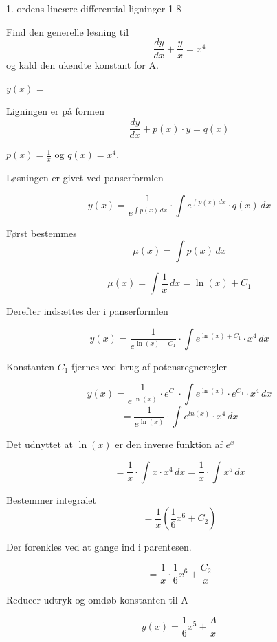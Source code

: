 \documentclass{article}
\begin{document}
\newpage

\begin{exercise}{1. ordens lineære differential ligninger 1-8}


Find den generelle løsning til
\[
\frac{dy}{dx} + \frac{y}{x} = x^4
\]
og kald den ukendte konstant for A.

$y(x)$ = 



\hint

Ligningen er på formen
\[
\frac{dy}{dx} + p(x) \cdot y = q(x)
\]

\hint

$p(x)=\frac{1}{x}$ og $q(x)=x^4$.

\hint

Løsningen er givet ved panserformlen


\hint

\[
y(x) = \frac{1}{e^{\int p(x) \, dx}} \cdot \int e^{\int p(x) \, dx} \cdot q(x) \, dx
\]

\hint

Først bestemmes
\[
\mu(x) = \int p(x) \, dx
\]

\hint
\[
\mu(x) = \int \frac{1}{x} \, dx = \ln(x)+ C_1
\]

\hint
Derefter indsættes der i panserformlen

\hint

\[
y(x) = \frac{1}{e^{\ln(x) + C_1}} \cdot \int e^{\ln(x) + C_1} \cdot x^4 \, dx
\]


\hint

Konstanten $C_1$ fjernes ved brug af potensregneregler

\hint
\[
y(x) = \frac{1}{e^{\ln(x)}} \cdot e^{C_1} \cdot \int e^{\ln(x)} \cdot e^{C_1} \cdot x^4 \, dx
\]
\[
= \frac{1}{e^{\ln(x)}} \cdot \int e^{ln(x)} \cdot x^4 \, dx
\]

\hint

Det udnyttet at $\ln(x)$ er den inverse funktion af $e^x$


\hint
\[
= \frac{1}{x} \cdot \int x \cdot x^4 \, dx = \frac{1}{x} \cdot \int x^5 \, dx
\]

\hint

Bestemmer integralet
\[
= \frac{1}{x} \left( \frac{1}{6}x^6 + C_2 \right)
\]

\hint

Der forenkles ved at gange ind i parentesen.

\hint
\[
= \frac{1}{x} \cdot \frac{1}{6}x^6 + \frac{C_2}{x}
\]

\hint

Reducer udtryk og omdøb konstanten til A

\hint
\[
y(x) = \frac{1}{6}x^5 + \frac{A}{x}
\]


\end{exercise}
\end{document}
